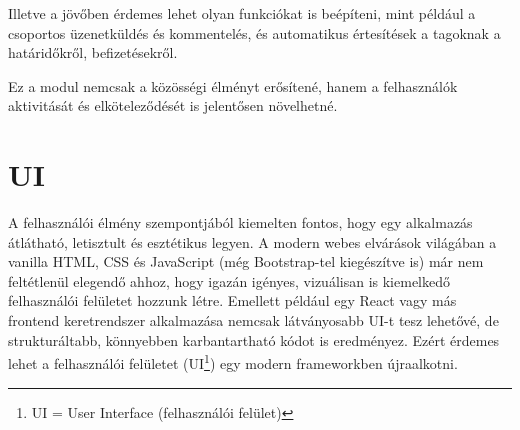 Illetve a jövőben érdemes lehet olyan funkciókat is beépíteni, mint például a csoportos üzenetküldés és kommentelés, és automatikus értesítések a tagoknak a határidőkről, befizetésekről.

Ez a modul nemcsak a közösségi élményt erősítené, hanem a felhasználók aktivitását és elköteleződését is jelentősen növelhetné.

\section{UI}
A felhasználói élmény szempontjából kiemelten fontos, hogy egy alkalmazás átlátható, letisztult és esztétikus legyen. A modern webes elvárások világában a vanilla HTML, CSS és JavaScript (még Bootstrap-tel kiegészítve is) már nem feltétlenül elegendő ahhoz, hogy igazán igényes, vizuálisan is kiemelkedő felhasználói felületet hozzunk létre. Emellett például egy React vagy más frontend keretrendszer alkalmazása nemcsak látványosabb UI-t tesz lehetővé, de strukturáltabb, könnyebben karbantartható kódot is eredményez. Ezért érdemes lehet a felhasználói felületet (UI\footnote{UI = User Interface (felhasználói felület)}) egy modern frameworkben újraalkotni.